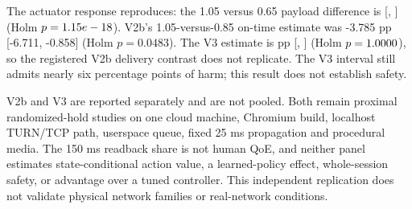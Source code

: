 \documentclass[10pt]{article}
\begin{document}
The actuator response reproduces: the 1.05 versus 0.65 payload difference is
\NativeActionVThreePayloadContrast{} [\NativeActionVThreePayloadLowCI{},
\NativeActionVThreePayloadHighCI{}] (Holm $p=1.15e-18{}$).
V2b's 1.05-versus-0.85 on-time estimate was -3.785 pp [-6.711, -0.858]
(Holm $p=0.0483$). The V3 estimate is
\NativeActionVThreeDeliveryContrast{} pp
[\NativeActionVThreeDeliveryLowCI{}, \NativeActionVThreeDeliveryHighCI{}]
(Holm $p=1.0000{}$), so the registered V2b delivery
contrast does not replicate. The V3 interval still admits nearly six percentage
points of harm; this result does not establish safety.

V2b and V3 are reported separately and are not pooled. Both remain proximal
randomized-hold studies on one cloud machine, Chromium build, localhost
TURN/TCP path, userspace queue, fixed 25 ms propagation and procedural media.
The 150 ms readback share is not human QoE, and neither panel estimates
state-conditional action value, a learned-policy effect, whole-session safety,
or advantage over a tuned controller. This independent replication does not
validate physical network families or real-network conditions.
\begin{table}[ht]
\centering\resizebox{\linewidth}{!}{}
\caption{V3 factual arm means from the independently seeded replication. The capture's summaries were not opened until its full inventory and independent audit passed.}
\label{tab:native-turn-action-v3-arms}
\end{table}
\begin{table}[ht]
\centering\resizebox{\linewidth}{!}{}
\caption{All six registered V3 proximal contrasts. Intervals use 64 peer clusters; one Holm correction covers both outcomes and all three pairwise action comparisons.}
\label{tab:native-turn-action-v3-contrasts}
\end{table}

\clearpage


\end{document}
